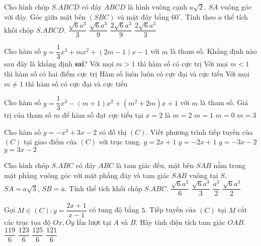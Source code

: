 \begin{ex}%
Cho hình chóp $S.ABCD$ có đáy $ABCD$ là hình vuông cạnh $a\sqrt{2}$, $SA$ vuông góc với đáy. Góc giữa mặt bên $(SBC)$ và mặt đáy bằng $60^\circ$. Tính theo $a$ thể tích khối chóp $S.ABCD$.
\choice
{$\dfrac{\sqrt{6}a^3}{3}$}
{$\dfrac{\sqrt{6}a^3}{9}$}
{$\dfrac{2\sqrt{6}a^3}{9}$}
{\True $\dfrac{2\sqrt{6}a^3}{3}$}
\end{ex}

\begin{ex}%
Cho hàm số $y=\dfrac{1}{3}x^3+mx^2+(2m-1)x-1$ với $m$ là tham số. Khẳng định nào sau đây là khẳng định \textbf{sai}?
\choice
{Với mọi $m>1$ thì hàm số có cực trị}
{Với mọi $m<1$ thì hàm số có hai điểm cực trị}
{\True Hàm số luôn luôn có cực đại và cực tiểu}
{Với mọi $m\neq 1$ thì hàm số có cực đại và cực tiểu}
\end{ex}

\begin{ex}%
Cho hàm số $y=\dfrac{1}{3}x^3-(m+1)x^2+(m^2+2m)x+1$ với $m$ là tham số. Giá trị của tham số $m$ để hàm số đạt cực tiểu tại $x=2$ là
\choice
{$m=2$}
{$m=1$}
{\True $m=0$}
{$m=3$}
\end{ex}

\begin{ex}%
Cho hàm số $y=-x^3+3x-2$ có đồ thị $(C)$. Viết phương trình tiếp tuyến của $(C)$ tại giao điểm của $(C)$ với trục tung.
\choice
{$y=2x+1$}
{$y=-2x+1$}
{$y=-3x-2$}
{\True $y=3x-2$}
\end{ex}

\begin{ex}%
Cho hình chóp $S.ABC$ có đáy $ABC$ là tam giác đều, mặt bên $SAB$ nằm trong mặt phẳng vuông góc với mặt phẳng đáy và tam giác $SAB$ vuông tại $S$, $SA=a\sqrt{3}$, $SB=a$. Tính thể tích khối chóp $S.ABC$.
\choice
{$\dfrac{\sqrt{6}a^3}{6}$}
{$\dfrac{\sqrt{6}a^3}{3}$}
{\True $\dfrac{a^3}{2}$}
{$\dfrac{\sqrt{6}a^3}{2}$}
\end{ex}

\begin{ex}%
Gọi $M\in (C): y=\dfrac{2x+1}{x-1}$ có tung độ bằng $5$. Tiếp tuyến của $(C)$ tại $M$ cắt các trục tọa độ $Ox, Oy$ lần lượt tại $A$ và $B$. Hãy tính diện tích tam giác $OAB$.
\choice
{$\dfrac{119}{6}$}
{$\dfrac{123}{6}$}
{$\dfrac{125}{6}$}
{\True $\dfrac{121}{6}$}
\end{ex}

